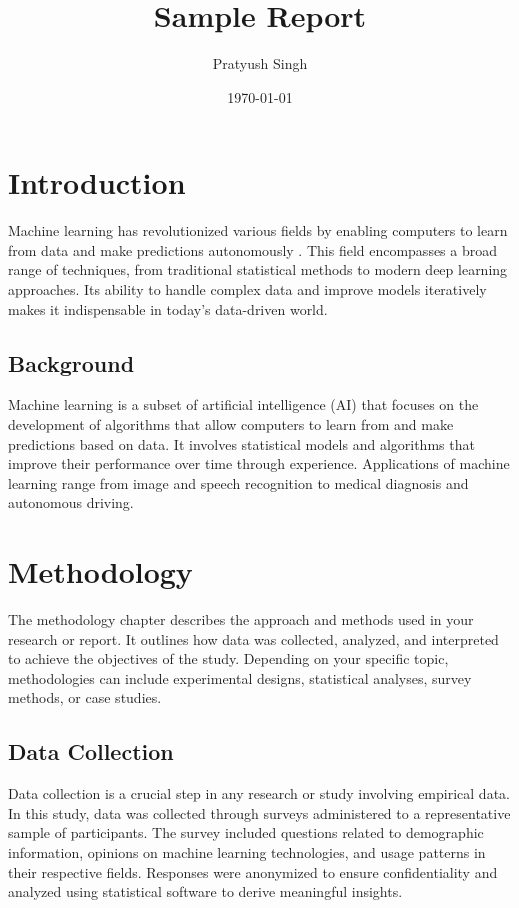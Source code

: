 \documentclass{report}
\title{Sample Report}
\author{Pratyush Singh}
\date{\today}
\begin{document}
\maketitle
\tableofcontents

\chapter{Introduction}

Machine learning has revolutionized various fields by enabling computers to learn from data and make predictions autonomously \cite{bishop_pattern_2006, goodfellow_deep_2016, hastie_elements_2009}. This field encompasses a broad range of techniques, from traditional statistical methods to modern deep learning approaches. Its ability to handle complex data and improve models iteratively makes it indispensable in today's data-driven world.

\section{Background}
Machine learning is a subset of artificial intelligence (AI) that focuses on the development of algorithms that allow computers to learn from and make predictions based on data. It involves statistical models and algorithms that improve their performance over time through experience. Applications of machine learning range from image and speech recognition to medical diagnosis and autonomous driving.

\chapter{Methodology}

The methodology chapter describes the approach and methods used in your research or report. It outlines how data was collected, analyzed, and interpreted to achieve the objectives of the study. Depending on your specific topic, methodologies can include experimental designs, statistical analyses, survey methods, or case studies.

\section{Data Collection}
Data collection is a crucial step in any research or study involving empirical data. In this study, data was collected through surveys administered to a representative sample of participants. The survey included questions related to demographic information, opinions on machine learning technologies, and usage patterns in their respective fields. Responses were anonymized to ensure confidentiality and analyzed using statistical software to derive meaningful insights.
\end{document}
